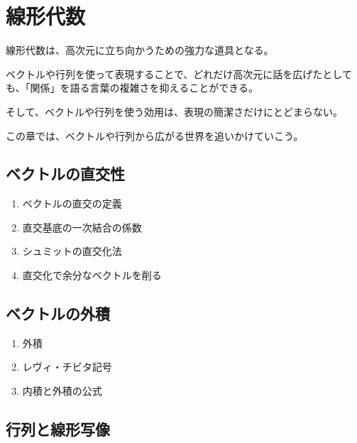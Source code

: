\documentclass[../imaging-math]{subfiles}
\begin{document}
\chapter{線形代数}

線形代数は、高次元に立ち向かうための強力な道具となる。

\br

ベクトルや行列を使って表現することで、どれだけ高次元に話を広げたとしても、「関係」を語る言葉の複雑さを抑えることができる。

そして、ベクトルや行列を使う効用は、表現の簡潔さだけにとどまらない。

\br

この章では、ベクトルや行列から広がる世界を追いかけていこう。






\section{ベクトルの直交性}

\begin{mindflow}
  \begin{enumerate}
    \item ベクトルの直交の定義
    \item 直交基底の一次結合の係数
    \item シュミットの直交化法
    \item 直交化で余分なベクトルを削る
  \end{enumerate}
\end{mindflow}

\section{ベクトルの外積}

\begin{mindflow}
  \begin{enumerate}
    \item 外積
    \item レヴィ・チビタ記号
    \item 内積と外積の公式
  \end{enumerate}
\end{mindflow}

\section{行列と線形写像}
\end{document}
